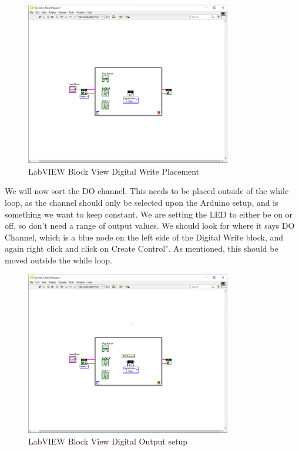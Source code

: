 \documentclass[a4paper,11pt]{report}
\begin{document}
\begin{figure}[H]
\centering
\includegraphics[width=0.8\textwidth]{screenshots/labview19}
\caption{LabVIEW Block View Digital Write Placement}
\end{figure}

We will now sort the DO channel. This needs to be placed outside of the while loop, as the channel should only be selected upon the Arduino setup, and is something we want to keep constant. We are setting the LED to either be on or off, so don't need a range of output values. We should look for where it says DO Channel, which is a blue node on the left side of the Digital Write block, and again right click and click on Create Control". As mentioned, this should be moved outside the while loop.

\begin{figure}[H]
\centering
\includegraphics[width=0.8\textwidth]{screenshots/labview20}
\caption{LabVIEW Block View Digital Output setup}
\end{figure}
\end{document}

